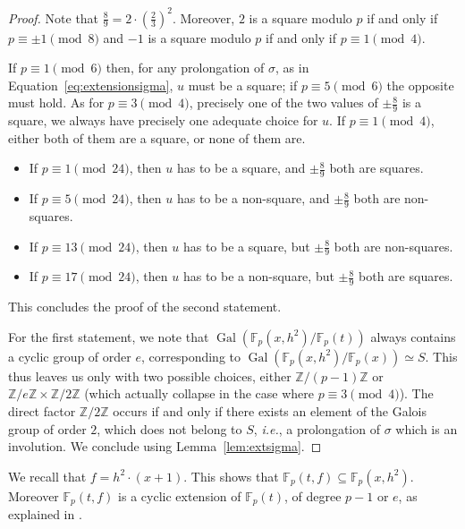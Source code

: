 \documentclass{article}
\newcommand{\Z}{\mathbb{Z}}
\newcommand{\F}{\mathbb{F}}
\DeclareMathOperator{\Gal}{Gal}
\theoremstyle{definition}
\theoremstyle{plain}
\theoremstyle{remark}
\begin{document}
\begin{proof}
Note that $\frac 8 9 = 2 \cdot \left(\frac 2 3\right)^2.$ Moreover, $2$ is a square modulo $p$ if and only if $p\equiv \pm 1 \pmod 8$ and $-1$ is a square modulo $p$ if and only if $p\equiv 1 \pmod 4$. 

If $p\equiv 1 \pmod 6$ then, for any prolongation of $\sigma$, as in Equation~\eqref{eq:extensionsigma}, $u$ must be a square; if $p\equiv 5 \pmod 6$ the opposite must hold. As for $p\equiv 3 \pmod 4$, precisely one of the two values of $\pm \frac 8 9$ is a square, we always have precisely one adequate choice for $u$. If $p\equiv 1 \pmod 4$, either both of them are a square, or none of them are. 
\begin{itemize}
    \item If $p\equiv 1 \pmod{24}$, then $u$ has to be a square, and $\pm \frac 8 9$ both are squares.
    \item If $p\equiv 5 \pmod{24}$, then $u$ has to be a non-square, and $\pm \frac 8 9$ both are non-squares.
    \item If $p\equiv 13 \pmod{24}$, then $u$ has to be a square, but $\pm \frac 8 9$ both are non-squares.
    \item If $p\equiv 17 \pmod{24}$, then $u$ has to be a non-square, but $\pm \frac 8 9$ both are squares.
\end{itemize}
This concludes the proof of the second statement. 

For the first statement, we note that $\Gal(\F_p(x,h^2)/\F_p(t))$ always contains a cyclic group of order $e$, corresponding to $\Gal(\F_p(x,h^2)/\F_p(x)) \simeq S$.
This thus leaves us only with two possible choices, either $\Z/(p{-}1)\Z$ or $\Z/e\Z\times \Z/2\Z$ (which actually collapse in the case where $p\equiv 3 \pmod 4$). The direct factor $\Z/2\Z$ occurs if and only if there exists an element of the Galois group of order $2$, which does not belong to $S$, \emph{i.e.}, a prolongation of $\sigma$ which is an involution. We conclude using Lemma~\ref{lem:extsigma}.
\end{proof}

We recall that $f=h^2\cdot (x+1)$. This shows that $\F_p(t, f)\subseteq \F_p(x, h^2).$ Moreover $\F_p(t, f)$ is a cyclic extension of $\F_p(t)$, of degree $p{-}1$ or $e$, as explained in \cite[Subsection~2.1.5]{CFV25}.
\end{document}
